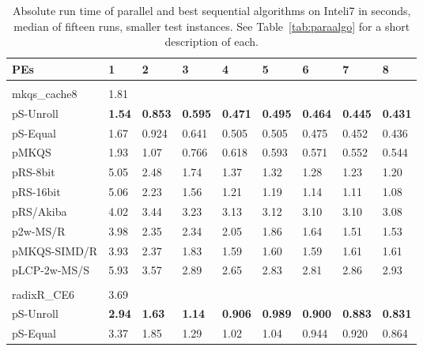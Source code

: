 \documentclass[a4paper]{myjournal}
\begin{document}
\def\tabcolsep{4pt}
\begin{table}\centering\small
\caption{Absolute run time of parallel and best sequential algorithms on Inteli7 in seconds, median of fifteen runs, smaller test instances. See Table~\ref{tab:paraalgo} for a short description of each.}\label{tab:absrun-Inteli7b}
\begin{tabularx}{\linewidth}{l|*{8}{>{\hfill}X}|@{}}
PEs          & 1   & 2 & 3 & 4 & 5 & 6 & 7 & 8                                                                                      \\ \hline
& \multicolumn{8}{l|}{\textbf{Sinha URLs} (complete), , , } \\ \cline{2-9}
mkqs\_cache8 & 1.81 &  &  &  &  &  &  &  \\
pS-Unroll & \bf 1.54 & \bf 0.853 & \bf 0.595 & \bf 0.471 & \bf 0.495 & \bf 0.464 & \bf 0.445 & \bf 0.431 \\
 pS-Equal &     1.67 &     0.924 &     0.641 &     0.505 &     0.505 &     0.475 &     0.452 &     0.436 \\
        pMKQS &     1.93 &      1.07 &     0.766 &     0.618 &     0.593 &     0.571 &     0.552 &     0.544 \\
     pRS-8bit &     5.05 &      2.48 &      1.74 &      1.37 &      1.32 &      1.28 &      1.23 &      1.20 \\
    pRS-16bit &     5.06 &      2.23 &      1.56 &      1.21 &      1.19 &      1.14 &      1.11 &      1.08 \\
    pRS/Akiba &     4.02 &      3.44 &      3.23 &      3.13 &      3.12 &      3.10 &      3.10 &      3.08 \\
     p2w-MS/R &     3.98 &      2.35 &      2.34 &      2.05 &      1.86 &      1.64 &      1.51 &      1.53 \\
 pMKQS-SIMD/R &     3.93 &      2.37 &      1.83 &      1.59 &      1.60 &      1.59 &      1.61 &      1.61 \\
 pLCP-2w-MS/S &     5.93 &      3.57 &      2.89 &      2.65 &      2.83 &      2.81 &      2.86 &      2.93 \\ \hline
& \multicolumn{8}{l|}{\textbf{Sinha DNA} (complete), , , } \\ \cline{2-9}
radixR\_CE6 & 3.69 &  &  &  &  &  &  &  \\
pS-Unroll & \bf 2.94 & \bf 1.63 & \bf 1.14 & \bf 0.906 & \bf 0.989 & \bf 0.900 & \bf 0.883 & \bf 0.831 \\
 pS-Equal &     3.37 &     1.85 &     1.29 &      1.02 &      1.04 &     0.944 &     0.920 &     0.864 \\

\end{tabularx}
\end{table}
\end{document}
